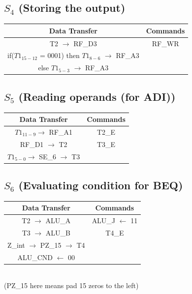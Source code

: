 \documentclass[]{report}
\begin{document}
        \subsection*{$S_4$ (Storing the output)}
        \begin{center}
            \begin{tabular}{|c|c|}
                \hline
                Data Transfer & Commands \\
                \hline
                T2 $\to$ RF\_D3 & RF\_WR\\
                if($T1_{15-12}$ = 0001) then $T1_{8-6}$ $\to$ RF\_A3 & \\
                else $T1_{5-3}$ $\to$ RF\_A3 & \\
                \hline
            \end{tabular}
        \end{center}
        \subsection*{$S_5$ (Reading operands (for ADI))}
        \begin{center}
            \begin{tabular}{|c|c|}
                \hline
                Data Transfer & Commands \\
                \hline
                $T1_{11-9} \to$ RF\_A1  & T2\_E\\
                RF\_D1 $\to$ T2 & T3\_E\\
                $T1_{5-0} \to$ SE\_6 $\to$ T3 & \\
                \hline
            \end{tabular}
        \end{center}

        \subsection*{$S_6$ (Evaluating condition for BEQ)} %
        \begin{center}
            \begin{tabular}{|c|c|}
                \hline
                Data Transfer & Commands \\
                \hline
                T2 $\to$ ALU\_A & ALU\_J $\leftarrow$ 11\\
                T3 $\to$ ALU\_B & T4\_E\\
                Z\_int $\to$ PZ\_15 $\to$ T4 & \\
                ALU\_CND $\leftarrow$ 00 & \\
                \hline
            \end{tabular}   \\
            (PZ\_15 here means pad 15 zeros to the left)
        \end{center}
\end{document}
